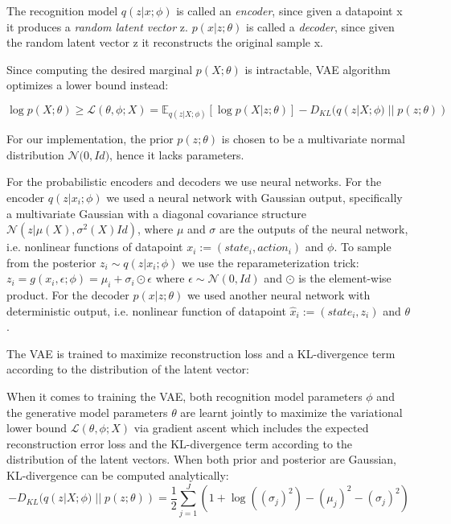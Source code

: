 The recognition model $q(z|x; \phi)$ is called an \textit{encoder},  since given a datapoint x it produces
a \textit{random latent vector} z.
$p(x|z; \theta)$ is called a \textit{decoder},
since given the random latent vector z it reconstructs the original sample x.

Since computing the desired marginal $p(X; \theta)$ is intractable, VAE algorithm optimizes a lower bound instead:

\begin{equation}
    \log p(X; \theta) \geq \mathcal{L}(\theta, \phi; X) = \mathbb E_{q(z|X;\phi)} [\log p(X|z; \theta)] - D_{KL}(q(z|X;\phi)\; ||\;p(z; \theta))
\end{equation}

For our implementation, the prior $p(z; \theta)$ is chosen to be a multivariate normal
distribution $\mathcal{N}\big( 0,Id\big )$, hence it lacks parameters.

For the probabilistic encoders and decoders we use neural networks.
For the encoder $q(z|x_i;\phi)$ we used a neural network with  Gaussian output, specifically a 
multivariate Gaussian with a diagonal covariance structure $\mathcal{N}(z | \mu(X), \sigma^2(X)Id)$,
where $\mu$ and $\sigma$ are the outputs of the neural network, i.e. nonlinear 
functions of datapoint $x_i:=(state_i,action_i)$ and $\phi$.
To sample from the posterior $z_i \sim q(z|x_i; \phi)$ we use the reparameterization trick:
$z_i = g(x_i, \epsilon; \phi)=\mu_i + \sigma_i \odot \epsilon$ where $\epsilon \sim  \mathcal{N}(0,Id)$
and $\odot$ is the element-wise product.
For the decoder $p(x|z; \theta)$ we used another neural network with deterministic output, i.e. nonlinear function of 
datapoint $\hat x_i:=(state_i,z_i)$ and $\theta$.


The VAE is trained to maximize  reconstruction loss and a KL-divergence term according to the distribution of
the latent vector:

When it comes to training the VAE, both recognition model parameters $\phi$ and the generative model parameters $\theta$ are
learnt jointly to maximize the variational lower bound $\mathcal{L}(\theta, \phi; X)$ via gradient ascent which includes the
expected reconstruction error loss and the KL-divergence term according to the distribution of the latent vectors.
When both prior and posterior are Gaussian, KL-divergence can be computed analytically:
\begin{equation}
    - D_{KL}(q(z|X;\phi)\; ||\;p(z; \theta)) = \frac{1}{2}\sum_{j=1}^J (1+\log((\sigma_j)^2)-(\mu_j)^2-(\sigma_j)^2)
\end{equation}


